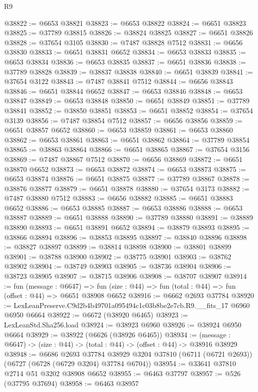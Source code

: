 \begin{lexlean}{R9}
\begin{coremodule}
@38822 := @6653 @38821
@38823 := @6653 @38822
@38824 := @6651 @38823
@38825 := @37789 @38815
@38826 := @38824 @38825
@38827 := @6651 @38826
@38828 := @37654 @3105
@38830 := @7487 @38828 @7512
@38831 := @6656 @38830
@38833 := @6651 @38831 @6652
@38834 := @6653 @38833
@38835 := @6653 @38834
@38836 := @6653 @38835
@38837 := @6651 @38836
@38838 := @37789 @38828
@38839 := @38837 @38838
@38840 := @6651 @38839
@38841 := @37654 @3122
@38843 := @7487 @38841 @7512
@38844 := @6656 @38843
@38846 := @6651 @38844 @6652
@38847 := @6653 @38846
@38848 := @6653 @38847
@38849 := @6653 @38848
@38850 := @6651 @38849
@38851 := @37789 @38841
@38852 := @38850 @38851
@38853 := @6651 @38852
@38854 := @37654 @3139
@38856 := @7487 @38854 @7512
@38857 := @6656 @38856
@38859 := @6651 @38857 @6652
@38860 := @6653 @38859
@38861 := @6653 @38860
@38862 := @6653 @38861
@38863 := @6651 @38862
@38864 := @37789 @38854
@38865 := @38863 @38864
@38866 := @6651 @38865
@38867 := @37654 @3156
@38869 := @7487 @38867 @7512
@38870 := @6656 @38869
@38872 := @6651 @38870 @6652
@38873 := @6653 @38872
@38874 := @6653 @38873
@38875 := @6653 @38874
@38876 := @6651 @38875
@38877 := @37789 @38867
@38878 := @38876 @38877
@38879 := @6651 @38878
@38880 := @37654 @3173
@38882 := @7487 @38880 @7512
@38883 := @6656 @38882
@38885 := @6651 @38883 @6652
@38886 := @6653 @38885
@38887 := @6653 @38886
@38888 := @6653 @38887
@38889 := @6651 @38888
@38890 := @37789 @38880
@38891 := @38889 @38890
@38893 := @6651 @38891 @6652
@38894 := @38879 @38893
@38895 := @38866 @38894
@38896 := @38853 @38895
@38897 := @38840 @38896
@38898 := @38827 @38897
@38899 := @38814 @38898
@38900 := @38801 @38899
@38901 := @38788 @38900
@38902 := @38775 @38901
@38903 := @38762 @38902
@38904 := @38749 @38903
@38905 := @38736 @38904
@38906 := @38723 @38905
@38907 := @38715 @38906
@38908 := @38707 @38907
@38914 := fun (message : @6647) =>
  fun (size : @44) => fun (total : @44) => fun (offset : @44) => @6651 @38908 @6652
@38916 := @6662 @2693 @37784
@38920 := LexLeanPreserve.C9d2b4b49701a095494c1c03b8be2e7cb.R9.__fits_17 @6960 @6950 @6664
@38922 := @6672 (@38920 @6465)
@38923 := LexLeanStd.Sha256.load
@38924 := @38923 @6960
@38926 := @38924 @6950 @6664
@38929 := @38922 (@6626 (@38926 @6465))
@38934 := (message : @6647) -> (size : @44) -> (total : @44) -> (offset : @44) -> @38916 @38929
@38948 := @6686
    @2693
    @37784
    @38929
    @3204
    @37810
    (@6711 (@6721 @2693))
    (@6727 (@6728 (@6729 @3204) @37784 @6704))
@38954 := @33641 @37810 @2714 @51 @3202 @38908 @6652
@38955 := @6463 @37797
@38957 := @526 (@37795 @37694)
@38958 := @6463 @38957

\end{coremodule}
\end{lexlean}
